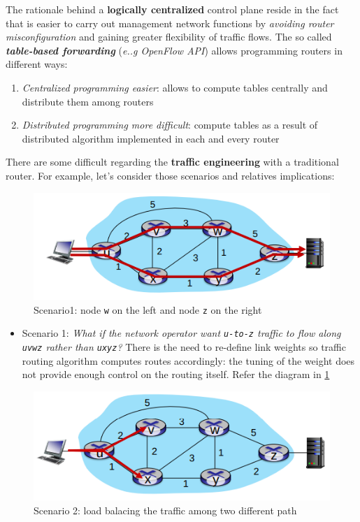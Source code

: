 \documentclass[10pt,a4paper]{report}
\theoremstyle{definition}
\begin{document}
The rationale behind  a \textbf{logically centralized} control plane reside in the fact that is easier to carry out management network functions by \textit{avoiding router misconfiguration} and gaining greater flexibility of traffic flows.
The so called \textit{\textbf{table-based forwarding}} (\textit{e..g OpenFlow API}) allows programming routers in different ways:
\begin{enumerate}
	\item 
	\textit{Centralized programming easier}: allows to compute tables centrally and distribute them among routers
	\item 
	\textit{Distributed programming more difficult}: compute tables as a result of distributed algorithm implemented in each and every router
\end{enumerate}

There are some difficult regarding the \textbf{traffic engineering} with a traditional router. For example, let's consider those scenarios and relatives implications:
\begin{figure}[h]
	\centering\includegraphics[scale=0.50]{images/Pasted image 20230322110125.png}
	\caption{Scenario1: node \texttt{w} on the left and node \texttt{z} on the right}
\label{q1-diagram}
\end{figure}

\begin{itemize}
	\item Scenario 1: \textit{What if the network operator want \texttt{u-to-z} traffic to flow along \texttt{uvwz} rather than \texttt{uxyz}?} There is the need to re-define link weights so traffic routing algorithm computes routes accordingly: the tuning of the weight does not provide enough control on the routing itself. Refer the diagram in \ref{q1-diagram}
\end{itemize}

\begin{figure}[h]
	\centering\includegraphics[scale=0.50]{images/Pasted image 20230322110143.png}
	\caption{Scenario 2: load balacing the traffic among two different path}
	\label{q2-diagram}
\end{figure}
\end{document}
